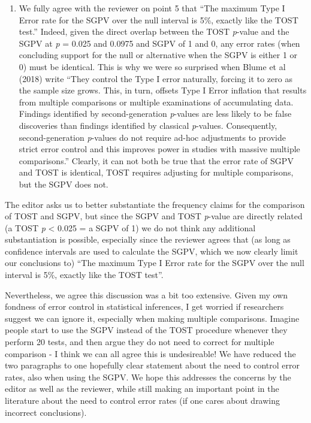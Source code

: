 \documentclass[man]{apa6}
\begin{document}
\begin{enumerate}
\item
  We fully agree with the reviewer on point 5 that \enquote{The maximum Type I Error rate for the SGPV over the null
  interval is 5\%, exactly like the TOST test.} Indeed, given the direct overlap between the TOST \emph{p}-value and the SGPV at \emph{p} = 0.025 and 0.0975 and SGPV of 1 and 0, any error rates (when concluding support for the null or alternative when the SGPV is either 1 or 0) must be identical. This is why we were so surprised when Blume et al (2018) write \enquote{They control the Type I error naturally, forcing it to zero as the sample size grows. This, in turn, offsets Type I Error inflation that results from multiple comparisons or multiple examinations of accumulating data. Findings identified by second-generation \emph{p}-values are less likely to be false discoveries than findings identified by classical \emph{p}-values. Consequently, second-generation \emph{p}-values do not require ad-hoc adjustments to provide strict error control and this improves power in studies with massive multiple comparisons.} Clearly, it can not both be true that the error rate of SGPV and TOST is identical, TOST requires adjusting for multiple comparisons, but the SGPV does not.
\end{enumerate}

The editor asks us to better substantiate the frequency claims for the comparison of TOST and SGPV, but since the SGPV and TOST \emph{p}-value are directly related (a TOST \emph{p} \textless{} 0.025 = a SGPV of 1) we do not think any additional substantiation is possible, especially since the reviewer agrees that (as long as confidence intervals are used to calculate the SGPV, which we now clearly limit our conclusions to) \enquote{The maximum Type I Error rate for the SGPV over the null interval is 5\%, exactly like the TOST test}.

Nevertheless, we agree this discussion was a bit too extensive. Given my own fondness of error control in statistical inferences, I get worried if researchers suggest we can ignore it, especially when making multiple comparisons. Imagine people start to use the SGPV instead of the TOST procedure whenever they perform 20 tests, and then argue they do not need to correct for multiple comparison - I think we can all agree this is undesireable! We have reduced the two paragraphs to one hopefully clear statement about the need to control error rates, also when using the SGPV. We hope this addresses the concerns by the editor as well as the reviewer, while still making an important point in the literature about the need to control error rates (if one cares about drawing incorrect conclusions).
\end{document}
